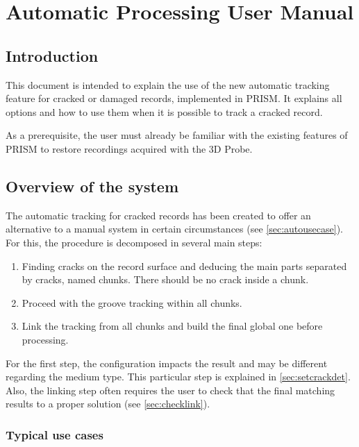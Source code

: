 
\chapter{Automatic Processing User Manual}
\label{chap:usermanauto}

\section{Introduction}

This document is intended to explain the use of the new automatic tracking feature for cracked or damaged records, implemented in PRISM. It explains all options and how to use them when it is possible to track a cracked record.

As a prerequisite, the user must already be familiar with the existing features of PRISM to restore recordings acquired with the 3D Probe.

\section{Overview of the system}

The automatic tracking for cracked records has been created to offer an alternative to a manual system in certain circumstances (see \autoref{sec:autousecase}). For this, the procedure is decomposed in several main steps:

\begin{enumerate}
\item Finding cracks on the record surface and deducing the main parts separated by cracks, named chunks. There should be no crack inside a chunk.
\item Proceed with the groove tracking within all chunks.
\item Link the tracking from all chunks and build the final global one before processing.
\end{enumerate}

For the first step, the configuration impacts the result and may be different regarding the medium type. This particular step is explained in \autoref{sec:setcrackdet}. Also, the linking step often requires the user to check that the final matching results to a proper solution (see \autoref{sec:checklink}).

\subsection{Typical use cases}
\label{sec:autousecase}

